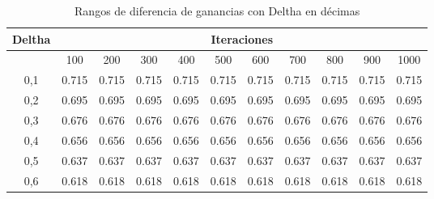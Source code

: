 \begin{table}[H]
\small
\caption{Rangos de diferencia de ganancias con Deltha en décimas}
\begin{tabular}{crrrrrrrrrr}
\hline
\multicolumn{1}{l}{Deltha} & \multicolumn{10}{c}{Iteraciones} \\ \hline
\multicolumn{1}{l}{}       & \multicolumn{1}{c}{100} & \multicolumn{1}{c}{200} & \multicolumn{1}{c}{300} & \multicolumn{1}{c}{400} & \multicolumn{1}{c}{500} & \multicolumn{1}{c}{600} & \multicolumn{1}{c}{700} & \multicolumn{1}{c}{800} & \multicolumn{1}{c}{900} & \multicolumn{1}{c}{1000} \\ \hline
0,1                          & 0.715                    & 0.715                    & 0.715                    & 0.715                    & 0.715                    & 0.715                    & 0.715                    & 0.715                    & 0.715                    & 0.715                     \\ 
0,2                          & 0.695                    & 0.695                    & 0.695                    & 0.695                    & 0.695                    & 0.695                    & 0.695                    & 0.695                    & 0.695                    & 0.695                     \\ 
0,3                          & 0.676                    & 0.676                    & 0.676                    & 0.676                    & 0.676                    & 0.676                    & 0.676                    & 0.676                    & 0.676                    & 0.676                     \\ 
0,4                          & 0.656                    & 0.656                    & 0.656                    & 0.656                    & 0.656                    & 0.656                    & 0.656                    & 0.656                    & 0.656                    & 0.656                     \\ 
0,5                          & 0.637                    & 0.637                    & 0.637                    & 0.637                    & 0.637                    & 0.637                    & 0.637                    & 0.637                    & 0.637                    & 0.637                     \\ 
0,6                          & 0.618                    & 0.618                    & 0.618                    & 0.618                    & 0.618                    & 0.618                    & 0.618                    & 0.618                    & 0.618                    & 0.618                     \\ 

\end{tabular}
\end{table}
